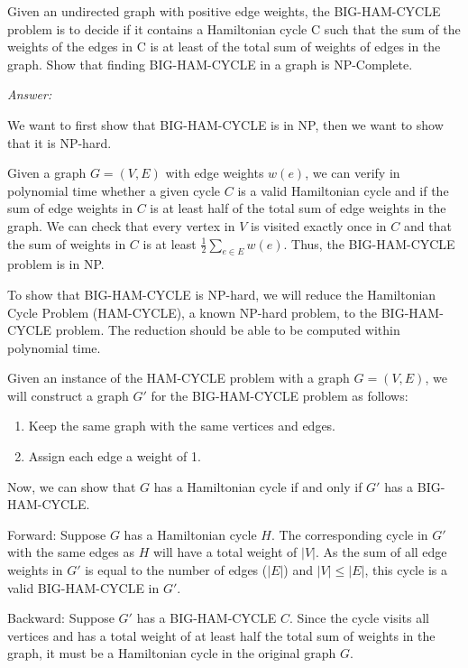 \documentclass[12pt]{article}
\newenvironment{problem}[2][Problem]{\begin{trivlist}
\item[\hskip \labelsep {\bfseries #1}\hskip \labelsep {\bfseries #2.}]}{\end{trivlist}}
\begin{document}
\begin{problem}{2}
    Given an undirected graph with positive edge weights, the BIG-HAM-CYCLE problem is to decide if it contains a Hamiltonian cycle C such that the sum of the weights of the edges in C is at least of the total sum of weights of edges in the graph. Show that finding BIG-HAM-CYCLE in a graph is NP-Complete.
\end{problem}

\textit{Answer:}

We want to first show that BIG-HAM-CYCLE is in NP, then we want to show that it is NP-hard.

Given a graph $G=(V,E)$ with edge weights $w(e)$, we can verify in polynomial time whether a given cycle $C$ is a valid Hamiltonian cycle and if the sum of edge weights in $C$ is at least half of the total sum of edge weights in the graph. We can check that every vertex in $V$ is visited exactly once in $C$ and that the sum of weights in $C$ is at least $\frac{1}{2} \sum_{e \in E} w(e)$. Thus, the BIG-HAM-CYCLE problem is in NP.

To show that BIG-HAM-CYCLE is NP-hard, we will reduce the Hamiltonian Cycle Problem (HAM-CYCLE), a known NP-hard problem, to the BIG-HAM-CYCLE problem. The reduction should be able to be computed within polynomial time.

Given an instance of the HAM-CYCLE problem with a graph $G=(V,E)$, we will construct a graph $G'$ for the BIG-HAM-CYCLE problem as follows:

\begin{enumerate}
\item Keep the same graph with the same vertices and edges.
\item Assign each edge a weight of 1.
\end{enumerate}

Now, we can show that $G$ has a Hamiltonian cycle if and only if $G'$ has a BIG-HAM-CYCLE.

Forward: Suppose $G$ has a Hamiltonian cycle $H$. The corresponding cycle in $G'$ with the same edges as $H$ will have a total weight of $|V|$. As the sum of all edge weights in $G'$ is equal to the number of edges ($|E|$) and $|V| \leq |E|$, this cycle is a valid BIG-HAM-CYCLE in $G'$.

Backward: Suppose $G'$ has a BIG-HAM-CYCLE $C$. Since the cycle visits all vertices and has a total weight of at least half the total sum of weights in the graph, it must be a Hamiltonian cycle in the original graph $G$.
\end{document}
